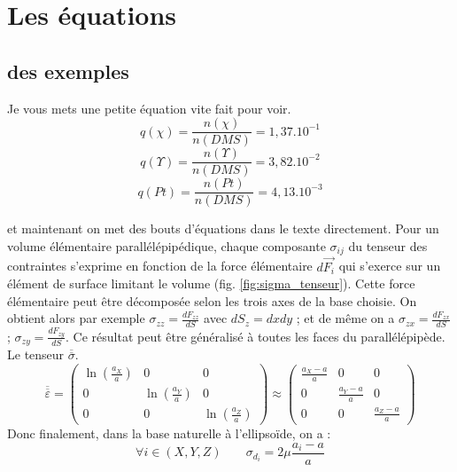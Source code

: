 \chapter{Les équations}
\label{chap_exp}
	\section{des exemples}
		\label{chap_exp:Composition chimique}
Je vous mets une petite équation vite fait pour voir. 
	\begin{equation}
		q(\chi)=\frac{n(\chi)}{n(DMS)} = 1,37.10^{-1} 
	\end{equation}
	\begin{equation}
		q(\Upsilon)=\frac{n(\Upsilon)}{n(DMS)} = 3,82.10^{-2}
	\end{equation}
	\begin{equation}
		q(Pt)=\frac{n(Pt)}{n(DMS)} = 4,13.10^{-3}
	\end{equation}			
	
	et maintenant on met des bouts d'équations dans le texte directement.
Pour un volume élémentaire parallélépipédique, chaque composante $\sigma_{ij}$ du tenseur des contraintes s'exprime en fonction de la force élémentaire $d\vec{F_i}$ qui s'exerce sur un élément de surface limitant le volume (fig. \ref{fig:sigma_tenseur}). Cette force élémentaire peut être décomposée selon les trois axes de la base choisie. On obtient alors par exemple $\sigma_{zz} = \frac{dF_{zz}}{dS}$ avec $dS_z = dxdy$ ; et de même on a $\sigma_{zx} = \frac{dF_{zx}}{dS}$ ; $\sigma_{zy} = \frac{dF_{zy}}{dS}$. Ce résultat peut être généralisé à toutes les faces du parallélépipède. Le tenseur $\overline{\overline{\sigma}}$. \\
\begin{equation}
\overline{\overline{\varepsilon}}
=
\begin{pmatrix}
\ln(\frac{a_X}{a}) & 0 & 0 \\ 
0 & \ln(\frac{a_Y}{a}) & 0 \\ 
0 & 0 & \ln(\frac{a_Z}{a}) 
\end{pmatrix}
\approx
\begin{pmatrix}
\frac{a_X-a}{a} & 0 & 0 \\ 
0 & \frac{a_Y-a}{a} & 0 \\ 
0 & 0 & \frac{a_Z-a}{a} 
\end{pmatrix}
\end{equation}
Donc finalement, dans la base naturelle à l'ellipsoïde, on a :
\begin{equation}
\boxed{
\forall i \in (X,Y,Z) 
\;\;\;\;\;\;\;
\sigma_{d_i} = 2\mu\frac{a_i-a}{a}
}
\label{equafinale_ln}
\end{equation}
